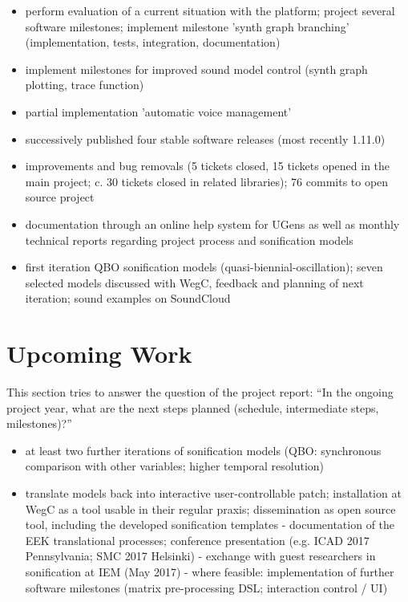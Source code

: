\documentclass[11pt,a4paper]{article}
\begin{document}
\begin{itemize}
\item perform evaluation of a current situation with the platform; project several software milestones; implement milestone 'synth graph branching' (implementation, tests, integration, documentation)
\item implement milestones for improved sound model control (synth graph plotting, trace function)
\item partial implementation 'automatic voice management'
\item successively published four stable software releases (most recently 1.11.0)
\item improvements and bug removals (5 tickets closed, 15 tickets opened in the main project; c. 30 tickets closed in related libraries); 76 commits to open source project
\item documentation through an online help system for UGens as well as monthly technical reports regarding project process and sonification models
\item first iteration QBO sonification models (quasi-biennial-oscillation); seven selected models discussed with WegC, feedback and planning of next iteration; sound examples on SoundCloud
\end{itemize}


\section{Upcoming Work}

This section tries to answer the question of the project report: ``In the ongoing project year, what are the next steps planned (schedule, intermediate steps, milestones)?''

\begin{itemize}
\item at least two further iterations of sonification models (QBO: synchronous comparison with other variables; higher temporal resolution)
\item translate models back into interactive user-controllable patch; installation at WegC as a tool usable in their regular praxis; dissemination as open source tool, including the developed sonification templates
- documentation of the EEK translational processes; conference presentation (e.g. ICAD 2017 Pennsylvania; SMC 2017 Helsinki)
- exchange with guest researchers in sonification at IEM (May 2017)
- where feasible: implementation of further software milestones (matrix pre-processing DSL; interaction control / UI)
\end{itemize}
\end{document}
